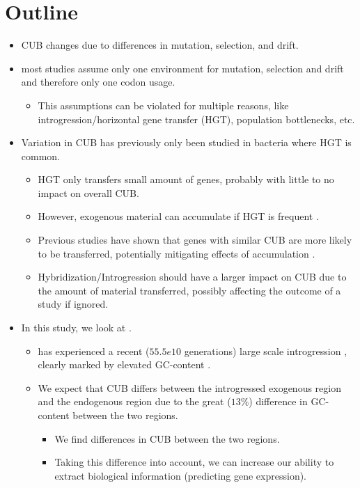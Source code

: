 \documentclass[12pt]{article}
\begin{document}
\section*{Outline}
\begin{itemize}
	\item CUB changes due to differences in mutation, selection, and drift.
	\item most studies assume only one environment for mutation, selection and drift and therefore only one codon usage.
	\begin{itemize}
		\item This assumptions can be violated for multiple reasons, like introgression/horizontal gene transfer (HGT), population bottlenecks, etc.
	\end{itemize}
	 \item Variation in CUB has previously only been studied in bacteria where HGT is common.
	\begin{itemize}
		\item HGT only transfers small amount of genes, probably with little to no impact on overall CUB.
		\item However, exogenous material can accumulate if HGT is frequent \citep{lawrence1997}.
		\item Previous studies have shown that genes with similar CUB are more likely to be transferred, potentially mitigating effects of accumulation \citep{tuller2011}.
		\item Hybridization/Introgression should have a larger impact on CUB due to the amount of material transferred, possibly affecting the outcome of a study if ignored. 
	\end{itemize}
	\item In this study, we look at \kluyveri.
	\begin{itemize}
		\item \kluyveri has experienced a recent ($55.5e10$ generations) large scale introgression \citep{friedrich2015}, clearly marked by elevated GC-content \citep{payen2009}.
		\item We expect that CUB differs between the introgressed exogenous region and the endogenous region due to the great ($13 \%$) difference in GC-content between the two regions.
		\begin{itemize}
			\item We find differences in CUB between the two regions.
			\item Taking this difference into account, we can increase our ability to extract biological information (predicting gene expression).

\end{itemize}
\end{itemize}
\end{itemize}
\end{document}
